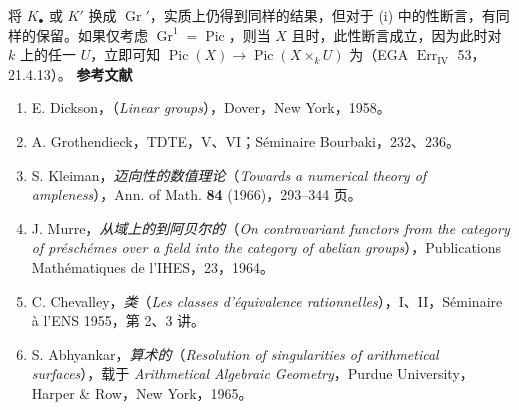 将 $K_\bullet$ 或 $K'$ 换成 $\operatorname{Gr}'$，实质上仍得到同样的结果，但对于 (i) 中的性断言，有同样的保留。如果仅考虑 $\operatorname{Gr}^1=\operatorname{Pic}$，则当 $X$ 且时，此性断言成立，因为此时对 $k$ 上的任一 $U$，立即可知 $\operatorname{Pic}(X)\to\operatorname{Pic}(X\times_k U)$ 为（EGA $\operatorname{Err}_{\mathrm{IV}}$ 53，21.4.13）。
\textbf{参考文献}
\begin{enumerate}
\item[{[1]}] E. Dickson，\emph{}（\emph{Linear groups}），Dover，New York，1958。
\item[{[2]}] A. Grothendieck，TDTE，V、VI；Séminaire Bourbaki，232、236。
\item[{[3]}] S. Kleiman，\emph{迈向性的数值理论}（\emph{Towards a numerical theory of ampleness}），Ann. of Math. \textbf{84} (1966)，293--344 页。
\item[{[4]}] J. Murre，\emph{从域上的到阿贝尔的}（\emph{On contravariant functors from the category of préschémes over a field into the category of abelian groups}），Publications Mathématiques de l'IHES，23，1964。
\item[{[5]}] C. Chevalley，\emph{类}（\emph{Les classes d'équivalence rationnelles}），I、II，Séminaire à l'ENS 1955，第 2、3 讲。
\item[{[6]}] S. Abhyankar，\emph{算术的}（\emph{Resolution of singularities of arithmetical surfaces}），载于 \emph{Arithmetical Algebraic Geometry}，Purdue University，Harper \& Row，New York，1965。
\end{enumerate}

